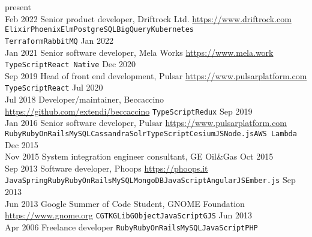 \documentclass[9pt]{developercv} %
\begin{document}
\begin{entrylist}
	\entry
		{present\\Feb 2022}
		{Senior product developer, Driftrock Ltd.}
		{\href{https://www.driftrock.com/}{https://www.driftrock.com}}
		{\texttt{Elixir}\slashsep\texttt{Phoenix}\slashsep\texttt{Elm}\slashsep\texttt{PostgreSQL}\slashsep\texttt{BigQuery}\slashsep\texttt{Kubernetes}\slashsep\\\texttt{Terraform}\slashsep\texttt{RabbitMQ}}
	\entry
		{Jan 2022\\Jan 2021}
		{Senior software developer, Mela Works}
		{\href{https://www.mela.work/}{https://www.mela.work}}
		{\texttt{TypeScript}\slashsep\texttt{React Native}}
	\entry
		{Dec 2020\\Sep 2019}
		{Head of front end development, Pulsar}
		{\href{https://www.pulsarplatform.com/}{https://www.pulsarplatform.com}}
		{\texttt{TypeScript}\slashsep\texttt{React}}
    \entry
        {Jul 2020\\Jul 2018}
        {Developer/maintainer, Beccaccino}
        {\href{https://github.com/extendi/beccaccino}{https://github.com/extendi/beccaccino}}
		{\texttt{TypeScript}\slashsep\texttt{Redux}}
	\entry
		{Sep 2019\\Jan 2016}
		{Senior software developer, Pulsar}
		{\href{https://www.pulsarplatform.com/}{https://www.pulsarplatform.com}}
		{\texttt{Ruby}\slashsep\texttt{RubyOnRails}\slashsep\texttt{MySQL}\slashsep\texttt{Cassandra}\slashsep\texttt{Solr}\slashsep\texttt{TypeScript}\slashsep\texttt{CesiumJS}\slashsep\texttt{Node.js}\slashsep\texttt{AWS Lambda}}
    \entry
		{Dec 2015\\Nov 2015}
		{System integration engineer consultant, GE Oil\&Gas}
		{}
		{}
    \entry
		{Oct 2015\\Sep 2013}
		{Software developer, Phoops}
		{\href{https://phoops.it/}{https://phoops.it}}
		{\texttt{Java}\slashsep\texttt{Spring}\slashsep\texttt{Ruby}\slashsep\texttt{RubyOnRails}\slashsep\texttt{MySQL}\slashsep\texttt{MongoDB}\slashsep\texttt{JavaScript}\slashsep\texttt{AngularJS}\slashsep\texttt{Ember.js}}
    \entry
		{Sep 2013\\Jun 2013}
		{Google Summer of Code Student, GNOME Foundation}
		{\href{https://www.gnome.org/}{https://www.gnome.org}}
		{\texttt{C}\slashsep\texttt{GTK}\slashsep\texttt{GLib}\slashsep\texttt{GObject}\slashsep\texttt{JavaScript}\slashsep\texttt{GJS}}
    \entry
		{Jun 2013\\Apr 2006}
		{Freelance developer}
		{}
		{\texttt{Ruby}\slashsep\texttt{RubyOnRails}\slashsep\texttt{MySQL}\slashsep\texttt{JavaScript}\slashsep\texttt{PHP}}
\end{entrylist}
\end{document}
